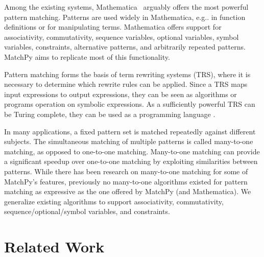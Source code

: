 \documentclass[conference,compsoc]{IEEEtran}
\makeatletter
\DeclareRobustCommand\onedot{\futurelet\@let@token\@onedot}
\def\@onedot{\ifx\@let@token.\else.\null\fi\xspace}
\def\eg{{e.g}\onedot} \def\Eg{{E.g}\onedot}
\newcommand{\henrik}[1]{{\color{rwthgreen} Henrik: #1}}
\makeatother
\begin{document}
Among the existing systems, Mathematica~\cite{Mathematica} arguably offers the
most powerful pattern matching.
Patterns are used widely in Mathematica, \eg in function definitions or for
manipulating terms.
Mathematica offers support for associativity, commutativity, sequence variables, optional variables, symbol variables, constraints, alternative patterns, and arbitrarily repeated patterns.
MatchPy aims to replicate most of this functionality.

Pattern matching forms the basis of term rewriting systems (TRS), where it is necessary to determine which rewrite rules can be applied. Since a TRS maps input expressions to output expressions, they can be seen as algorithms or programs operation on symbolic expressions. As a sufficiently powerful TRS can be Turing complete, they can be used as a programming language \cite{Kirchner2001}.

In many applications, a fixed pattern set is matched repeatedly against different subjects.
The simultaneous matching of multiple patterns is called many-to-one matching, as opposed to one-to-one matching.
Many-to-one matching can provide a significant speedup over one-to-one matching by exploiting similarities between patterns.
While there has been research on many-to-one matching for some of MatchPy's features, previously no many-to-one algorithms existed for pattern matching as expressive as the one offered by MatchPy (and Mathematica). We generalize existing algorithms to support associativity, commutativity, sequence/optional/symbol variables, and constraints.




\section{Related Work}
\end{document}
